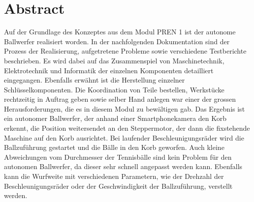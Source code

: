 
\section*{Abstract}
Auf der Grundlage des Konzeptes aus dem Modul PREN 1 ist der autonome Ballwerfer realisiert worden. In der nachfolgenden Dokumentation sind der Prozess der Realisierung, aufgetretene Probleme sowie verschiedene Testberichte beschrieben. Es wird dabei auf das Zusammenspiel von Maschinetechnik, Elektrotechnik und Informatik der einzelnen Komponenten detailliert eingegangen. Ebenfalls erwähnt ist die Herstellung einzelner Schlüsselkomponenten. Die Koordination von Teile bestellen, Werkstücke rechtzeitig in Auftrag geben sowie selber Hand anlegen war einer der grossen Herausforderungen, die es in diesem Modul zu bewältigen gab. Das Ergebnis ist ein autonomer Ballwerfer, der anhand einer Smartphonekamera den Korb erkennt, die Position weitersendet an den Steppermotor, der dann die fixstehende Maschine auf den Korb ausrichtet. Bei laufender Beschleunigungsräder wird die Ballzuführung gestartet und die Bälle in den Korb geworfen. Auch kleine Abweichungen vom Durchmesser der Tennisbälle sind kein Problem für den autonomen Ballwerfer, da dieser sehr schnell angepasst werden kann. Ebenfalls kann die Wurfweite mit verschiedenen Parametern, wie der Drehzahl der Beschleunigungsräder oder der Geschwindigkeit der Ballzuführung, verstellt werden.

